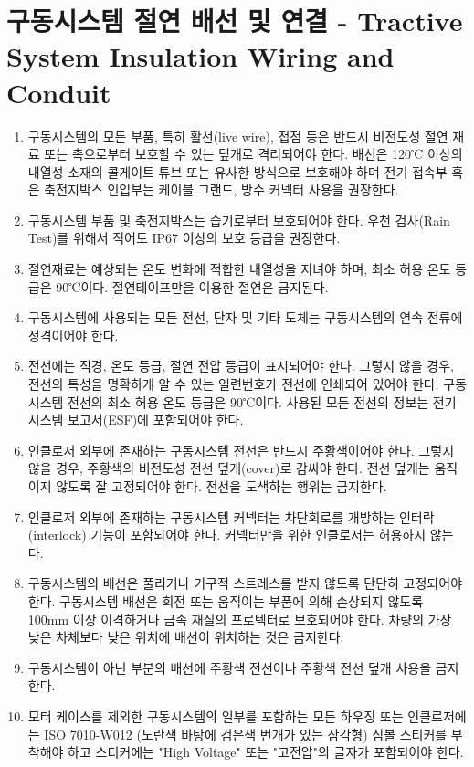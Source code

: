 \documentclass[final,a4paper,10pt]{report}
\begin{document}
\section{구동시스템 절연 배선 및 연결 - Tractive System Insulation Wiring and Conduit}
\begin{enumerate}
  \item 구동시스템의 모든 부품, 특히 활선(live wire), 접점 등은 반드시 비전도성 절연 재료 또는 촉으로부터 보호할 수 있는 덮개로 격리되어야 한다. 배선은 120℃ 이상의 내열성 소재의 콜게이트 튜브 또는 유사한 방식으로 보호해야 하며 전기 접속부 혹은 축전지박스 인입부는 케이블 그랜드, 방수 커넥터 사용을 권장한다.
  \item 구동시스템 부품 및 축전지박스는 습기로부터 보호되어야 한다. 우천 검사(Rain Test)를 위해서 적어도 IP67 이상의 보호 등급을 권장한다.
  \item 절연재료는 예상되는 온도 변화에 적합한 내열성을 지녀야 하며, 최소 허용 온도 등급은 90℃이다. 절연테이프만을 이용한 절연은 금지된다.
  \item 구동시스템에 사용되는 모든 전선, 단자 및 기타 도체는 구동시스템의 연속 전류에 정격이어야 한다.
  \item 전선에는 직경, 온도 등급, 절연 전압 등급이 표시되어야 한다. 그렇지 않을 경우, 전선의 특성을 명확하게 알 수 있는 일련번호가 전선에 인쇄되어 있어야 한다. 구동시스템 전선의 최소 허용 온도 등급은 90℃이다. 사용된 모든 전선의 정보는 전기시스템 보고서(ESF)에 포함되어야 한다.
  \item 인클로저 외부에 존재하는 구동시스템 전선은 반드시 주황색이어야 한다. 그렇지 않을 경우, 주황색의 비전도성 전선 덮개(cover)로 감싸야 한다. 전선 덮개는 움직이지 않도록 잘 고정되어야 한다. 전선을 도색하는 행위는 금지한다.
  \item 인클로저 외부에 존재하는 구동시스템 커넥터는 차단회로를 개방하는 인터락(interlock) 기능이 포함되어야 한다. 커넥터만을 위한 인클로저는 허용하지 않는다.
  \item 구동시스템의 배선은 풀리거나 기구적 스트레스를 받지 않도록 단단히 고정되어야 한다. 구동시스템 배선은 회전 또는 움직이는 부품에 의해 손상되지 않도록 100mm 이상 이격하거나 금속 재질의 프로텍터로 보호되어야 한다. 차량의 가장 낮은 차체보다 낮은 위치에 배선이 위치하는 것은 금지한다.
  \item 구동시스템이 아닌 부분의 배선에 주황색 전선이나 주황색 전선 덮개 사용을 금지한다.
  \item 모터 케이스를 제외한 구동시스템의 일부를 포함하는 모든 하우징 또는 인클로저에는 ISO 7010-W012 (노란색 바탕에 검은색 번개가 있는 삼각형) 심볼 스티커를 부착해야 하고 스티커에는 "High Voltage" 또는 "고전압"의 글자가 포함되어야 한다.
  

\end{enumerate}
\end{document}
